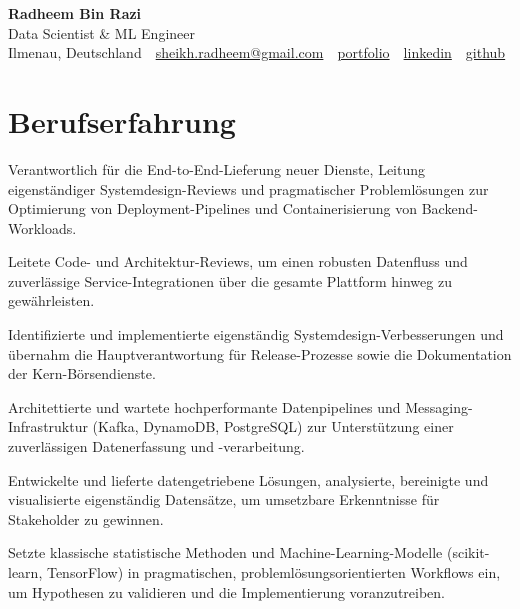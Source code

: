 \documentclass[11pt,a4paper]{resume}
\makeatletter
\newcommand{\Portfolio}{https://radheem.github.io/my-cv}
\newcommand{\PortfolioText}{portfolio}
\newcommand{\GitHub}{https://github.com/radheem}
\newcommand{\LinkedIn}{https://www.linkedin.com/in/radheem-razi}
\newcommand{\Email}{sheikh.radheem@gmail.com}
\makeatother
\begin{document}
\clearpage
{}

\begin{center}
  {\huge\bfseries Radheem Bin Razi}\\[3pt]
  {\large Data Scientist \& ML Engineer}\\[6pt]
  \small
  Ilmenau, Deutschland \,\textbar\,
  \href{mailto:\Email}{\Email} \,\textbar\,
  \href{\Portfolio}{\PortfolioText} \,\textbar\,
  \href{\LinkedIn}{linkedin} \,\textbar\,
  \href{\GitHub}{github}
\end{center}
\vspace{2pt}

\section{Berufserfahrung}

\bullets
  \item Verantwortlich für die End-to-End-Lieferung neuer Dienste, Leitung eigenständiger Systemdesign-Reviews und pragmatischer Problemlösungen zur Optimierung von Deployment-Pipelines und Containerisierung von Backend-Workloads.
  \item Leitete Code- und Architektur-Reviews, um einen robusten Datenfluss und zuverlässige Service-Integrationen über die gesamte Plattform hinweg zu gewährleisten.
\bulletsend
\vspace{3pt}
\bullets
  \item Identifizierte und implementierte eigenständig Systemdesign-Verbesserungen und übernahm die Hauptverantwortung für Release-Prozesse sowie die Dokumentation der Kern-Börsendienste.
  \item Architettierte und wartete hochperformante Datenpipelines und Messaging-Infrastruktur (Kafka, DynamoDB, PostgreSQL) zur Unterstützung einer zuverlässigen Datenerfassung und -verarbeitung.
\bulletsend
\vspace{3pt}
\bullets
  \item Entwickelte und lieferte datengetriebene Lösungen, analysierte, bereinigte und visualisierte eigenständig Datensätze, um umsetzbare Erkenntnisse für Stakeholder zu gewinnen.
  \item Setzte klassische statistische Methoden und Machine-Learning-Modelle (scikit-learn, TensorFlow) in pragmatischen, problemlösungsorientierten Workflows ein, um Hypothesen zu validieren und die Implementierung voranzutreiben.
\bulletsend
\vspace{3pt}
\end{document}
